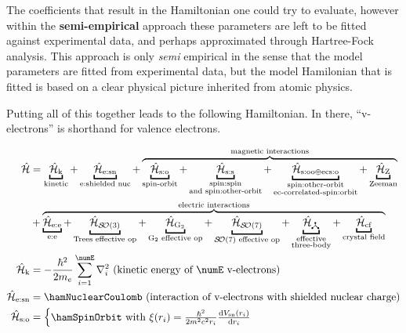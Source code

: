 \documentclass{article}
\begin{document}
The coefficients that result in the Hamiltonian one could try to evaluate, however within the  \textbf{semi-empirical} approach these parameters are left to be fitted against experimental data, and perhaps approximated through Hartree-Fock analysis. This approach is only \textit{semi} empirical in the sense that the model parameters are fitted from experimental data, but the model Hamilonian that is fitted is based on a clear physical picture inherited from atomic physics.

Putting all of this together leads to the following Hamiltonian. In there, ``v-electrons'' is shorthand for valence electrons.

\begin{mdframed}
\begin{align} 
	\ham &= \underbracket{\hamKineticSymbol}_{\text{kinetic}}
		 + \underbracket{\hamNuclearCoulombSymbol}_{\text{e:shielded nuc}}
		 + \overbrace{\underbracket{\hamSpinOrbitSymbol}_{\text{spin-orbit}}
		 + \underbracket{\hamSpinSpinSymbol}_{
		 			\substack{
		 				\text{spin:spin} \\ 
		 				\text{and spin:other-orbit}
		 				}
		 			} 
         + \underbracket{\hamSOOplusECSOSymbol}_{
            \substack{
                \text{spin:other-orbit} \\ 
                \text{ec-correlated-spin:orbit}
                }
         }
         + \underbracket{\hamZeemanSymbol}_{\text{Zeeman}}}^{\text{magnetic interactions}} \\
         & + \overbrace{\underbracket{\hamCoulombEESymbol}_{\text{e:e}} 
         + \underbracket{\hamTreesSymbol}_\text{Trees effective op} 
		 + \underbracket{\hamGTwoSymbol}_\text{G${}_2$ effective op} 
		 + \underbracket{\hamSOSevenSymbol}_\text{$\SO{7}$ effective op} 
		 + \underbracket{\ham_{\trispoke}}_{\substack{
            \text{effective} \\
            \text{three-body}}}
         + \underbracket{\hamCrystalFieldSymbol}_{\text{crystal field}}}^{\text{electric interactions}}  \\
	\hamKineticSymbol &= -\frac{\hbar^2}{2m_e}\sum_{i=1}^\numE \nabla_i^2 \text{ (kinetic energy of $\numE$ v-electrons)}\\
	\hamNuclearCoulombSymbol &= \hamNuclearCoulomb \text{ (interaction of v-electrons with shielded nuclear charge)} \\
	\hamSpinOrbitSymbol &= \begin{cases} 
			\hamSpinOrbit \text{ with } \xi{(r_i)} = \frac{\hbar^2}{2 m^2 c^2 r_i} \frac{\diff{V_\text{sn}(r_i)}}{\diff{r_i}} \\

\end{cases}
\end{align}
\end{mdframed}
\end{document}
